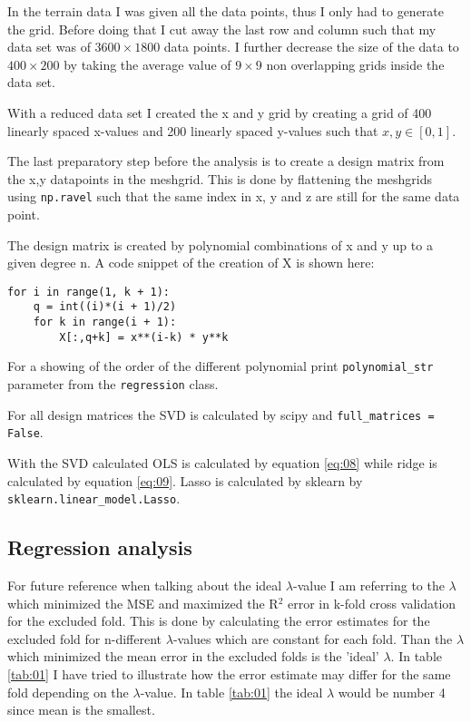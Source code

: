 \documentclass[uio,jmp,amsmath,amssymb,reprint,nofootinbib]{revtex4-1}
\numberwithin{equation}{section}
\begin{document}
In the terrain data I was given all the data points, thus I only had to generate the grid. Before doing that I cut away the last row and column such that my data set was of \(3600\times 1800\) data points. I further decrease the size of the data to \(400\times 200\) by taking the average value of \(9\times 9\) non overlapping grids inside the data set.

With a reduced data set I created the x and y grid by creating a grid of 400 linearly spaced x-values and 200 linearly spaced y-values such that \(x, y \in [0, 1]\).

The last preparatory step before the analysis is to create a design matrix from the x,y datapoints in the meshgrid. This is done by flattening the meshgrids using \texttt{np.ravel} such that the same index in x, y and z are still for the same data point.

The design matrix is created  by polynomial combinations of x and y up to a given degree n. A code snippet of the creation of X is shown here:
\begin{verbatim}
for i in range(1, k + 1):
    q = int((i)*(i + 1)/2)
    for k in range(i + 1):
        X[:,q+k] = x**(i-k) * y**k
\end{verbatim}
For a showing of the order of the different polynomial print \texttt{polynomial\_str} parameter from the \texttt{regression} class.

For all design matrices the SVD is calculated by scipy and \texttt{full\_matrices = False}.

With the SVD calculated OLS is calculated by equation \ref{eq:08} while ridge is calculated by equation \ref{eq:09}. Lasso is calculated by sklearn by \texttt{sklearn.linear\_model.Lasso}.


\subsection{Regression analysis}

For future reference when talking about the ideal \(\lambda\)-value I am referring to the \(\lambda\) which minimized the MSE and maximized the R\(^2\) error in k-fold cross validation for the excluded fold. This is done by calculating the error estimates for the excluded fold for n-different \(\lambda\)-values which are constant for each fold. Than the \(\lambda\) which minimized the mean error in the excluded folds is the 'ideal' \(\lambda\). In table \ref{tab:01} I have tried to illustrate how the error estimate may differ for the same fold depending on the \(\lambda\)-value. In table \ref{tab:01} the ideal \(\lambda\) would be number 4 since mean is the smallest. 
\end{document}
